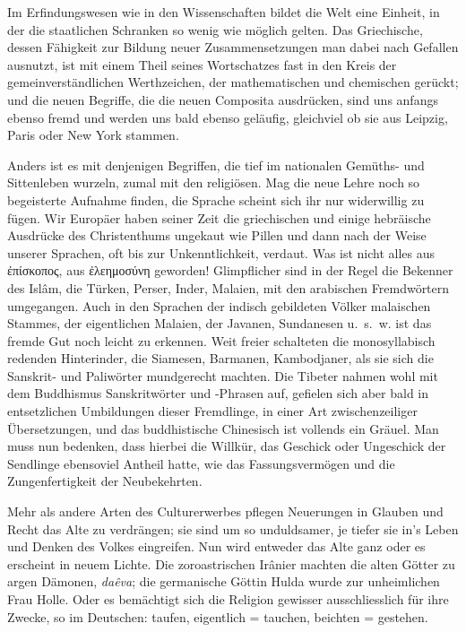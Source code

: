{Im Erfindungswesen wie in den Wissenschaften bildet die  Welt eine Einheit, in der die staatlichen Schranken so wenig wie möglich gelten. Das Griechische, dessen Fähigkeit zur Bildung neuer Zusammensetzungen man dabei nach Gefallen ausnutzt, ist mit einem Theil seines Wort\-\label{sp.231}schatzes fast in den Kreis der gemeinverständlichen Werthzeichen, der mathematischen und chemischen gerückt; und die neuen Begriffe, die die neuen Composita ausdrücken, sind uns anfangs ebenso fremd und werden uns bald ebenso geläufig, gleichviel ob sie aus Leipzig, Paris oder New York stammen.

Anders ist es mit denjenigen Begriffen, die tief im nationalen Gemüths- und Sittenleben wurzeln, zumal mit den religiösen. Mag die neue Lehre noch so begeisterte Aufnahme finden, die Sprache scheint sich ihr nur widerwillig zu fügen. Wir Europäer haben seiner Zeit die griechischen und einige hebräische Ausdrücke des Christenthums un\-\label{fp.229}gekaut wie Pillen  und dann nach der Weise unserer Sprachen, oft bis zur Unkenntlichkeit, verdaut. Was ist nicht alles aus ἐπίσκοπος, aus ἐλεημοσύνη geworden! Glimpflicher sind in der Regel die Bekenner des Islâm, die Türken, Perser, Inder, Malaien,  mit den arabischen Fremdwörtern umgegangen. Auch in den Sprachen der indisch gebildeten Völker malaischen Stammes, der eigentlichen Malaien, der Javanen, Sundanesen u.~s.~w. ist das fremde Gut noch leicht zu erkennen. Weit freier schalteten die monosyllabisch redenden Hinterinder, die Siamesen, Barmanen, Kambodjaner, als sie sich die Sanskrit- und Paliwörter mundgerecht machten. Die Tibeter nahmen wohl mit dem Buddhismus Sanskritwörter und -Phrasen auf, gefielen sich aber bald in entsetzlichen Umbildungen dieser Fremdlinge, in einer Art zwischenzeiliger Übersetzungen, und das buddhistische Chinesisch ist vollends ein Gräuel. Man muss nun bedenken, dass hierbei die Willkür, das Geschick oder Ungeschick der Sendlinge ebensoviel Antheil hatte, wie das Fassungsvermögen und die Zungenfertigkeit der Neubekehrten.

Mehr als andere Arten des Culturerwerbes pflegen Neuerungen in Glauben und Recht das Alte zu verdrängen; sie sind um so unduldsamer, je tiefer sie in’s Leben und Denken des Volkes eingreifen. Nun wird entweder das Alte ganz  oder es erscheint in neuem Lichte. Die zoroastrischen Irânier machten die alten Götter zu argen Dämonen, \textit{daêva}; die germanische Göttin Hulda wurde zur unheimlichen Frau Holle. Oder es bemächtigt sich die Religion gewisser  ausschliesslich für ihre Zwecke, so im Deutschen: taufen, eigentlich = tauchen, beichten = gestehen.

}
